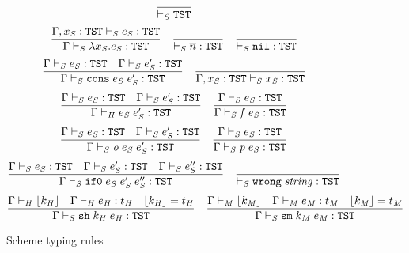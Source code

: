 \begin{figure}[p]
\[
\frac
{}
{ \vdash_{\mathit{S}} \mathtt{TST}}
\]
\bigskip
\[
\frac
{\Gamma , x_{\mathit{S}} : \mathtt{TST} \vdash_{\mathit{S}} e_{\mathit{S}} : \mathtt{TST}}
{\Gamma \vdash_{\mathit{S}} \lambda x_{\mathit{S}} . e_{\mathit{S}} : \mathtt{TST}}
\quad
\frac
{}
{ \vdash_{\mathit{S}} \overline{n} : \mathtt{TST}}
\quad
\frac
{}
{ \vdash_{\mathit{S}} \mathtt{nil} : \mathtt{TST}}
\]
\[
\frac
{\Gamma \vdash_{\mathit{S}} e_{\mathit{S}} : \mathtt{TST} \quad \Gamma \vdash_{\mathit{S}} e_{\mathit{S}}' : \mathtt{TST}}
{\Gamma \vdash_{\mathit{S}} \mathtt{cons} \; e_{\mathit{S}} \; e_{\mathit{S}}' : \mathtt{TST}}
\quad
\frac
{}
{\Gamma , x_{\mathit{S}} : \mathtt{TST} \vdash_{\mathit{S}} x_{\mathit{S}} : \mathtt{TST}}
\]
\[
\frac
{\Gamma \vdash_{\mathit{S}} e_{\mathit{S}} : \mathtt{TST} \quad \Gamma \vdash_{\mathit{S}} e_{\mathit{S}}' : \mathtt{TST}}
{\Gamma\vdash_{\mathit{H}}e_{\mathit{S}} \; e_{\mathit{S}}':\mathtt{TST}}
\quad
\frac
{\Gamma \vdash_{\mathit{S}} e_{\mathit{S}} : \mathtt{TST}}
{\Gamma \vdash_{\mathit{S}} \mathit{f} \; e_{\mathit{S}} : \mathtt{TST}}
\]
\[
\frac
{\Gamma \vdash_{\mathit{S}} e_{\mathit{S}} : \mathtt{TST} \quad \Gamma \vdash_{\mathit{S}} e_{\mathit{S}}' : \mathtt{TST}}
{\Gamma \vdash_{\mathit{S}} \mathit{o} \; e_{\mathit{S}} \; e_{\mathit{S}}' : \mathtt{TST}}
\quad
\frac
{\Gamma \vdash_{\mathit{S}} e_{\mathit{S}} : \mathtt{TST}}
{\Gamma \vdash_{\mathit{S}} \mathit{p} \; e_{\mathit{S}} : \mathtt{TST}}
\]
\[
\frac
{\Gamma \vdash_{\mathit{S}} e_{\mathit{S}} : \mathtt{TST} \quad \Gamma \vdash_{\mathit{S}} e_{\mathit{S}}' : \mathtt{TST} \quad \Gamma \vdash_{\mathit{S}} e_{\mathit{S}}'' : \mathtt{TST}}
{\Gamma \vdash_{\mathit{S}} \mathtt{if0} \; e_{\mathit{S}} \; e_{\mathit{S}}' \; e_{\mathit{S}}'' : \mathtt{TST}}
\quad
\frac
{}
{ \vdash_{\mathit{S}} \mathtt{wrong} \; \mathit{string} : \mathtt{TST}}
\]
\[
\frac
{\Gamma \vdash_{\mathit{H}} \lfloor k_{\mathit{H}} \rfloor \quad \Gamma \vdash_{\mathit{H}} e_{\mathit{H}} : t_{\mathit{H}} \quad \lfloor k_{\mathit{H}} \rfloor = t_{\mathit{H}}}
{\Gamma \vdash_{\mathit{S}} \mathtt{sh} \; k_{\mathit{H}} \; e_{\mathit{H}} : \mathtt{TST}}
\quad
\frac
{\Gamma \vdash_{\mathit{M}} \lfloor k_{\mathit{M}} \rfloor \quad \Gamma \vdash_{\mathit{M}} e_{\mathit{M}} : t_{\mathit{M}} \quad \lfloor k_{\mathit{M}} \rfloor = t_{\mathit{M}}}
{\Gamma \vdash_{\mathit{S}} \mathtt{sm} \; k_{\mathit{M}} \; e_{\mathit{M}} : \mathtt{TST}}
\]
\caption{Scheme typing rules}
\label{str}
\end{figure}
